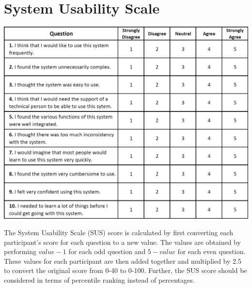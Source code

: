 
\appendix
\chapter{System Usability Scale} {
\label{app:system_usability_scale}

	\includegraphics[width=\textwidth]{images/design/sus}

	The System Usability Scale (SUS) score is calculated by first converting each participant's score for each question to a new value. The values are obtained by performing $value - 1$ for each odd question and $5 - value$ for each even question. These values for each participant are then added together and multiplied by 2.5 to convert the original score from 0-40 to 0-100. Further, the SUS score should be considered in terms of percentile ranking instead of percentages.




}

